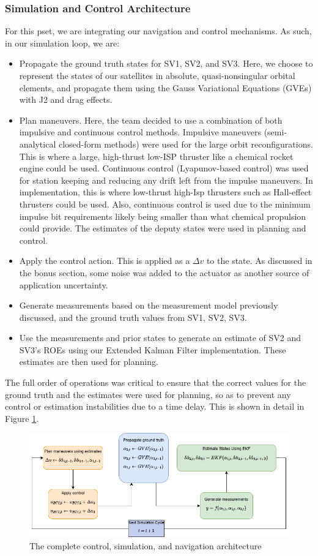 \subsubsection{Simulation and Control Architecture}
For this pset, we are integrating our navigation and control mechanisms. As such, in our simulation loop, we are:
\begin{itemize}
    \item Propagate the ground truth states for SV1, SV2, and SV3. Here, we choose to represent the states of our satellites in absolute, quasi-nonsingular orbital elements, and propagate them using the Gauss Variational Equations (GVEs) with J2 and drag effects. 
    \item Plan maneuvers. Here, the team decided to use a combination of both impulsive and continuous control methods. Impulsive maneuvers (semi-analytical closed-form methods) were used for the large orbit reconfigurations. This is where a large, high-thrust low-ISP thruster like a chemical rocket engine could be used. Continuous control (Lyapunov-based control) was used for station keeping and reducing any drift left from the impulse maneuvers. In implementation, this is where low-thrust high-Isp thrusters such as Hall-effect thrusters could be used. Also, continuous control is used due to the minimum impulse bit requirements likely being smaller than what chemical propulsion could provide. The estimates of the deputy states were used in planning and control.
    \item Apply the control action. This is applied as a $\Delta v$ to the state. As discussed in the bonus section, some noise was added to the actuator as another source of application uncertainty.
    \item Generate measurements based on the measurement model previously discussed, and the ground truth values from SV1, SV2, SV3.
    \item Use the measurements and prior states to generate an estimate of SV2 and SV3's ROEs using our Extended Kalman Filter implementation. These estimates are then used for planning.
\end{itemize}

The full order of operations was critical to ensure that the correct values for the ground truth and the estimates were used for planning, so as to prevent any control or estimation instabilities due to a time delay. This is shown in detail in Figure \ref{fig:nav_control_arch}.

\begin{figure}[H]
    \centering
    \includegraphics[width=0.85\linewidth]{LaTeX/PS9/soss_control_nav_arch.png}
    \caption{The complete control, simulation, and navigation architecture}
    \label{fig:nav_control_arch}
\end{figure}

